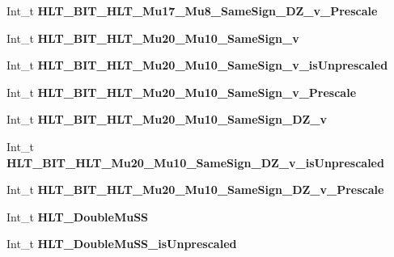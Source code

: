 \begin{DoxyCompactItemize}
\hypertarget{classMiniTree_a9709f23750c1d82265ccb871b0596dd3}{}\label{classMiniTree_a9709f23750c1d82265ccb871b0596dd3} 
Int\+\_\+t {\bfseries H\+L\+T\+\_\+\+B\+I\+T\+\_\+\+H\+L\+T\+\_\+\+Mu17\+\_\+\+Mu8\+\_\+\+Same\+Sign\+\_\+\+D\+Z\+\_\+v\+\_\+\+Prescale}
\item 
\hypertarget{classMiniTree_ac3c9591b08e07a044351258a7b27116a}{}\label{classMiniTree_ac3c9591b08e07a044351258a7b27116a} 
Int\+\_\+t {\bfseries H\+L\+T\+\_\+\+B\+I\+T\+\_\+\+H\+L\+T\+\_\+\+Mu20\+\_\+\+Mu10\+\_\+\+Same\+Sign\+\_\+v}
\item 
\hypertarget{classMiniTree_a473769eb9df2ab8981946228efcf3d3f}{}\label{classMiniTree_a473769eb9df2ab8981946228efcf3d3f} 
Int\+\_\+t {\bfseries H\+L\+T\+\_\+\+B\+I\+T\+\_\+\+H\+L\+T\+\_\+\+Mu20\+\_\+\+Mu10\+\_\+\+Same\+Sign\+\_\+v\+\_\+is\+Unprescaled}
\item 
\hypertarget{classMiniTree_aaf6dc3ec6215fd291b9812917099c9e1}{}\label{classMiniTree_aaf6dc3ec6215fd291b9812917099c9e1} 
Int\+\_\+t {\bfseries H\+L\+T\+\_\+\+B\+I\+T\+\_\+\+H\+L\+T\+\_\+\+Mu20\+\_\+\+Mu10\+\_\+\+Same\+Sign\+\_\+v\+\_\+\+Prescale}
\item 
\hypertarget{classMiniTree_a5e00ce5d087798f0f87e87873478ad31}{}\label{classMiniTree_a5e00ce5d087798f0f87e87873478ad31} 
Int\+\_\+t {\bfseries H\+L\+T\+\_\+\+B\+I\+T\+\_\+\+H\+L\+T\+\_\+\+Mu20\+\_\+\+Mu10\+\_\+\+Same\+Sign\+\_\+\+D\+Z\+\_\+v}
\item 
\hypertarget{classMiniTree_a09c25991bcc040badab626249de468d7}{}\label{classMiniTree_a09c25991bcc040badab626249de468d7} 
Int\+\_\+t {\bfseries H\+L\+T\+\_\+\+B\+I\+T\+\_\+\+H\+L\+T\+\_\+\+Mu20\+\_\+\+Mu10\+\_\+\+Same\+Sign\+\_\+\+D\+Z\+\_\+v\+\_\+is\+Unprescaled}
\item 
\hypertarget{classMiniTree_a6f4276025d883aea21ab9b31cb166866}{}\label{classMiniTree_a6f4276025d883aea21ab9b31cb166866} 
Int\+\_\+t {\bfseries H\+L\+T\+\_\+\+B\+I\+T\+\_\+\+H\+L\+T\+\_\+\+Mu20\+\_\+\+Mu10\+\_\+\+Same\+Sign\+\_\+\+D\+Z\+\_\+v\+\_\+\+Prescale}
\item 
\hypertarget{classMiniTree_af2f90055cb743f9b438262e69715313b}{}\label{classMiniTree_af2f90055cb743f9b438262e69715313b} 
Int\+\_\+t {\bfseries H\+L\+T\+\_\+\+Double\+Mu\+SS}
\item 
\hypertarget{classMiniTree_a15aac14a060102b02fa5558f1949d43d}{}\label{classMiniTree_a15aac14a060102b02fa5558f1949d43d} 
Int\+\_\+t {\bfseries H\+L\+T\+\_\+\+Double\+Mu\+S\+S\+\_\+is\+Unprescaled}
\item 
\hypertarget{classMiniTree_ac2680cb55e3b8952ab97b6ed893344ec}{}\label{classMiniTree_ac2680cb55e3b8952ab97b6ed893344ec} 

\end{DoxyCompactItemize}
